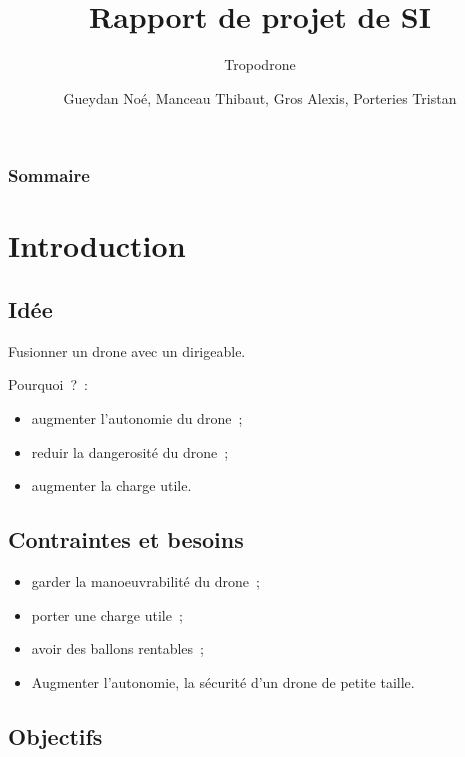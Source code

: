 \documentclass{beamer}
\title{Rapport de projet de SI}
\subtitle{Tropodrone}
\author{Gueydan Noé, Manceau Thibaut, Gros Alexis, Porteries Tristan}
\begin{document}
\begin{frame}
  \titlepage
\end{frame}

\begin{frame}
    \frametitle{Sommaire}
    \begin{multicols}{2}
      {
		\setcounter{tocdepth}{1}
        \tableofcontents
      }
    \end{multicols}
\end{frame}

\section{Introduction}

\subsection{Idée}

\begin{frame}{}
 Fusionner un drone avec un dirigeable.
 
 Pourquoi~?~:
 \begin{itemize}
  \item augmenter l'autonomie du drone~;
  \item reduir la dangerosité du drone~;
  \item augmenter la charge utile.
 \end{itemize}

\end{frame}

\subsection{Contraintes et besoins}

\begin{frame}{}
	\begin{itemize}
		\item garder la manoeuvrabilité du drone~;
		\item porter une charge utile~;
		\item avoir des ballons rentables~;
		\item Augmenter l’autonomie, la sécurité d’un drone de petite taille.
	\end{itemize}

\end{frame}


\subsection{Objectifs}
\end{document}
